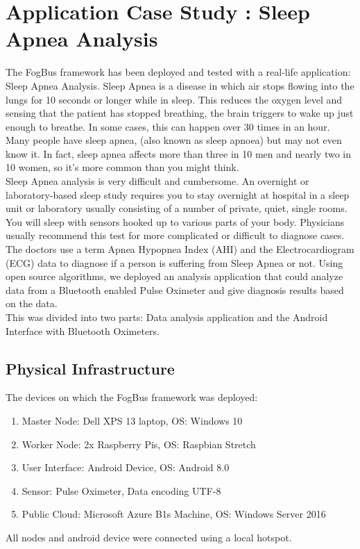 \documentclass[10pt,journal,compsoc]{IEEEtran}
\begin{document}
\section{Application Case Study : Sleep Apnea Analysis}
The FogBus framework has been deployed and tested with a real-life application: Sleep Apnea Analysis. Sleep Apnea is a disease in which air stops flowing into the lungs for 10 seconds or longer while in sleep. This reduces the oxygen level and sensing that the patient has stopped breathing, the brain triggers to wake up just enough to breathe. In some cases, this can happen over 30 times in an hour. Many people have sleep apnea, (also known as sleep apnoea) but may not even know it. In fact, sleep apnea affects more than three in 10 men and nearly two in 10 women, so it's more common than you might think. \\
Sleep Apnea analysis is very difficult and cumbersome. An overnight or laboratory-based sleep study requires you to stay overnight at hospital in a sleep unit or laboratory usually consisting of a number of private, quiet, single rooms.  You will sleep with sensors hooked up to various parts of your body.  Physicians usually recommend this test for more complicated or difficult to diagnose cases.\\
The doctors use a term Apnea Hypopnea Index (AHI) and the Electrocardiogram (ECG) data to diagnose if a person is suffering from Sleep Apnea or not. Using open source algorithms, we deployed an analysis application that could analyze data from a Bluetooth enabled Pulse Oximeter and give diagnosis results based on the data.\\
This was divided into two parts: Data analysis application and the Android Interface with Bluetooth Oximeters.

\subsection{Physical Infrastructure}
The devices on which the FogBus framework was deployed:
\begin{enumerate}
\item Master Node: Dell XPS 13 laptop, OS: Windows 10 
\item Worker Node: 2x Raspberry Pis, OS: Raspbian Stretch
\item User Interface: Android Device, OS: Android 8.0
\item Sensor: Pulse Oximeter, Data encoding UTF-8
\item Public Cloud: Microsoft Azure B1s Machine, OS: Windows Server 2016
\end{enumerate}
All nodes and android device were connected using a local hotspot.
\end{document}
